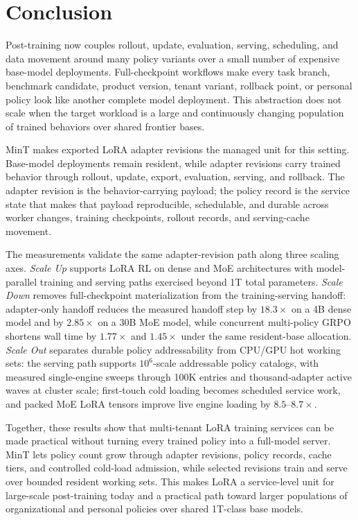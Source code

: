 \section{Conclusion}

Post-training now couples rollout, update, evaluation, serving, scheduling, and data movement around many policy variants over a small number of expensive base-model deployments. Full-checkpoint workflows make every task branch, benchmark candidate, product version, tenant variant, rollback point, or personal policy look like another complete model deployment. This abstraction does not scale when the target workload is a large and continuously changing population of trained behaviors over shared frontier bases.

MinT makes exported LoRA adapter revisions the managed unit for this setting. Base-model deployments remain resident, while adapter revisions carry trained behavior through rollout, update, export, evaluation, serving, and rollback. The adapter revision is the behavior-carrying payload; the policy record is the service state that makes that payload reproducible, schedulable, and durable across worker changes, training checkpoints, rollout records, and serving-cache movement.

The measurements validate the same adapter-revision path along three scaling axes. \textit{Scale Up} supports LoRA RL on dense and MoE architectures with model-parallel training and serving paths exercised beyond 1T total parameters. \textit{Scale Down} removes full-checkpoint materialization from the training-serving handoff: adapter-only handoff reduces the measured handoff step by $18.3\times$ on a 4B dense model and by $2.85\times$ on a 30B MoE model, while concurrent multi-policy GRPO shortens wall time by $1.77\times$ and $1.45\times$ under the same resident-base allocation. \textit{Scale Out} separates durable policy addressability from CPU/GPU hot working sets: the serving path supports $10^6$-scale addressable policy catalogs, with measured single-engine sweeps through 100K entries and thousand-adapter active waves at cluster scale; first-touch cold loading becomes scheduled service work, and packed MoE LoRA tensors improve live engine loading by $8.5$--$8.7\times$.

Together, these results show that multi-tenant LoRA training services can be made practical without turning every trained policy into a full-model server. MinT lets policy count grow through adapter revisions, policy records, cache tiers, and controlled cold-load admission, while selected revisions train and serve over bounded resident working sets. This makes LoRA a service-level unit for large-scale post-training today and a practical path toward larger populations of organizational and personal policies over shared 1T-class base models.